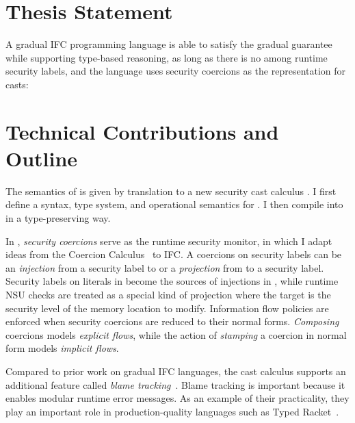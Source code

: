 \section{Thesis Statement}

{\color{NavyBlue} %

A gradual IFC programming language is able to satisfy the gradual guarantee
while supporting type-based reasoning, as long as there is no \unk among runtime
security labels, and the language uses security coercions as the representation
for casts:

\vspace{20pt}
}%

\section{Technical Contributions and Outline}

The semantics of \Surface is given by translation to a new security cast
calculus \CC. I first define a syntax, type system, and operational semantics
for \CC. I then compile \Surface into \CC in a type-preserving way.

In \CC, \textit{security coercions} serve as the runtime security monitor, in
which I adapt ideas from the Coercion
Calculus~\parencite{Henglein:1994nz,Herman:2010aa} to IFC. A coercions on
security labels can be an \textit{injection} from a security label to \unk or a
\textit{projection} from \unk to a security label. Security labels on literals
in \Surface become the sources of injections in \CC, while runtime NSU checks
are treated as a special kind of projection where the target is the security
level of the memory location to modify. Information flow policies are enforced
when security coercions are reduced to their normal forms. \textit{Composing}
coercions models \textit{explicit flows}, while the action of \textit{stamping}
a coercion in normal form models \textit{implicit flows}.

Compared to prior work on gradual IFC languages, the \CC cast calculus supports
an additional feature called \textit{blame tracking}~\parencite{Findler:2002eu}.
Blame tracking is important because it enables modular runtime error messages.
As an example of their practicality, they play an important role in
production-quality languages such as Typed
Racket~\parencite{Tobin-Hochstadt:2008lr,Preston-Tunnell-Wilson:2018aa}.

